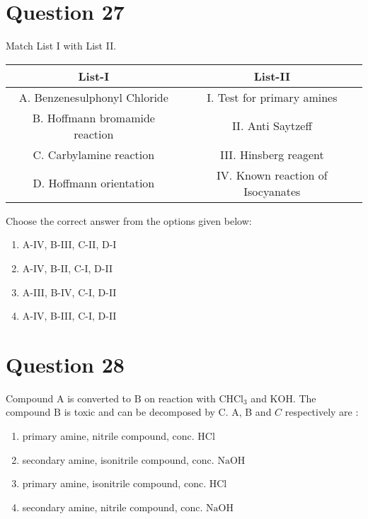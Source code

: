 \documentclass{article}
\begin{document}
\section*{Question 27}
Match List I with List II.
    \setlength{\arrayrulewidth}{0.8mm}
    \begin{tabular}{|c|c|}
    \hline
    List-I & List-II \\
\hline
A. Benzenesulphonyl Chloride & I. Test for primary amines \\
\hline
B. Hoffmann bromamide reaction & II. Anti Saytzeff \\
\hline
C. Carbylamine reaction & III. Hinsberg reagent \\
\hline
D. Hoffmann orientation & IV. Known reaction of Isocyanates \\
\hline

    \end{tabular}
    \setlength{\arrayrulewidth}{0.4mm}
    Choose the correct answer from the options given below: \newline
\begin{enumerate}[label=(\alph*)]
\item A-IV, B-III, C-II, D-I
\item A-IV, B-II, C-I, D-II
\item A-III, B-IV, C-I, D-II
\item A-IV, B-III, C-I, D-II
\end{enumerate}
\newpage
\section*{Question 28}
Compound \(\mathrm{A}\) is converted to \(\mathrm{B}\) on reaction with \(\mathrm{CHCl}_3\) and \(\mathrm{KOH}\). The compound \(\mathrm{B}\) is toxic and can be decomposed by C. A, B and \(C\) respectively are :
\begin{enumerate}[label=(\alph*)]
\item primary amine, nitrile compound, conc. \(\mathrm{HCl}\)
\item secondary amine, isonitrile compound, conc. \(\mathrm{NaOH}\)
\item primary amine, isonitrile compound, conc. \(\mathrm{HCl}\)
\item secondary amine, nitrile compound, conc. \(\mathrm{NaOH}\)
\end{enumerate}
\newpage
\end{document}

